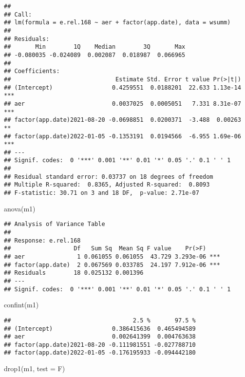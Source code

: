 \documentclass[
]{article}
\newenvironment{Shaded}{\begin{snugshade}}{\end{snugshade}}
\newcommand{\AttributeTok}[1]{\textcolor[rgb]{0.77,0.63,0.00}{#1}}
\newcommand{\FunctionTok}[1]{\textcolor[rgb]{0.00,0.00,0.00}{#1}}
\newcommand{\NormalTok}[1]{#1}
\newcommand{\StringTok}[1]{\textcolor[rgb]{0.31,0.60,0.02}{#1}}
\begin{document}
\begin{verbatim}
## 
## Call:
## lm(formula = e.rel.168 ~ aer + factor(app.date), data = wsumm)
## 
## Residuals:
##       Min        1Q    Median        3Q       Max 
## -0.080035 -0.024089  0.002087  0.018987  0.066965 
## 
## Coefficients:
##                              Estimate Std. Error t value Pr(>|t|)    
## (Intercept)                 0.4259551  0.0188201  22.633 1.13e-14 ***
## aer                         0.0037025  0.0005051   7.331 8.31e-07 ***
## factor(app.date)2021-08-20 -0.0698851  0.0200371  -3.488  0.00263 ** 
## factor(app.date)2022-01-05 -0.1353191  0.0194566  -6.955 1.69e-06 ***
## ---
## Signif. codes:  0 '***' 0.001 '**' 0.01 '*' 0.05 '.' 0.1 ' ' 1
## 
## Residual standard error: 0.03737 on 18 degrees of freedom
## Multiple R-squared:  0.8365, Adjusted R-squared:  0.8093 
## F-statistic: 30.71 on 3 and 18 DF,  p-value: 2.71e-07
\end{verbatim}

\begin{Shaded}
\begin{Highlighting}[]
\FunctionTok{anova}\NormalTok{(m1)}
\end{Highlighting}
\end{Shaded}

\begin{verbatim}
## Analysis of Variance Table
## 
## Response: e.rel.168
##                  Df   Sum Sq  Mean Sq F value    Pr(>F)    
## aer               1 0.061055 0.061055  43.729 3.293e-06 ***
## factor(app.date)  2 0.067569 0.033785  24.197 7.912e-06 ***
## Residuals        18 0.025132 0.001396                      
## ---
## Signif. codes:  0 '***' 0.001 '**' 0.01 '*' 0.05 '.' 0.1 ' ' 1
\end{verbatim}

\begin{Shaded}
\begin{Highlighting}[]
\FunctionTok{confint}\NormalTok{(m1)}
\end{Highlighting}
\end{Shaded}

\begin{verbatim}
##                                   2.5 %       97.5 %
## (Intercept)                 0.386415636  0.465494589
## aer                         0.002641399  0.004763638
## factor(app.date)2021-08-20 -0.111981551 -0.027788710
## factor(app.date)2022-01-05 -0.176195933 -0.094442180
\end{verbatim}

\begin{Shaded}
\begin{Highlighting}[]
\FunctionTok{drop1}\NormalTok{(m1, }\AttributeTok{test =} \StringTok{\textquotesingle{}F\textquotesingle{}}\NormalTok{)}
\end{Highlighting}
\end{Shaded}
\end{document}
